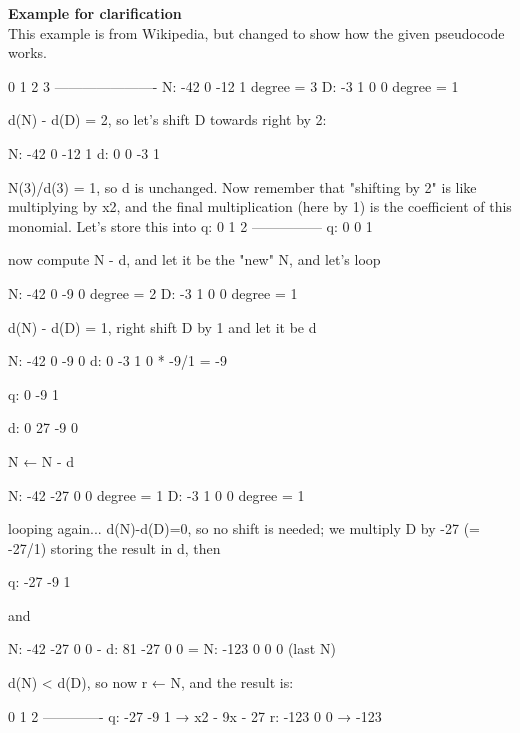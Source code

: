 \textbf{Example for clarification} \\ This example is from Wikipedia,
but changed to show how the given pseudocode works.

\begin{wideverbatim}
      0    1    2    3
   ----------------------
N:  -42    0  -12    1        degree = 3
D:   -3    1    0    0        degree = 1

   d(N) - d(D) = 2, so let's shift D towards right by 2:

N:  -42    0  -12    1
d:    0    0   -3    1

   N(3)/d(3) = 1, so d is unchanged. Now remember that "shifting by 2"
   is like multiplying by x2, and the final multiplication
   (here by 1) is the coefficient of this monomial. Let's store this
   into q:
                               0     1     2
                              ---------------
                          q:   0     0     1

   now compute N - d, and let it be the "new" N, and let's loop

N:  -42    0   -9    0        degree = 2
D:   -3    1    0    0        degree = 1

   d(N) - d(D) = 1, right shift D by 1 and let it be d

N:  -42    0   -9    0
d:    0   -3    1    0        * -9/1 = -9

                          q:   0    -9     1

d:    0   27   -9    0        

   N ← N - d

N:  -42  -27    0    0        degree = 1
D:   -3    1    0    0        degree = 1

   looping again... d(N)-d(D)=0, so no shift is needed; we
   multiply D by -27 (= -27/1) storing the result in d, then

                          q:  -27   -9     1

   and

N:  -42  -27    0    0        -
d:   81  -27    0    0        =
N: -123    0    0    0        (last N)

    d(N) < d(D), so now r ← N, and the result is:

       0   1  2
   -------------
q:   -27  -9  1   →  x2 - 9x - 27
r:  -123   0  0   →          -123
\end{wideverbatim}



